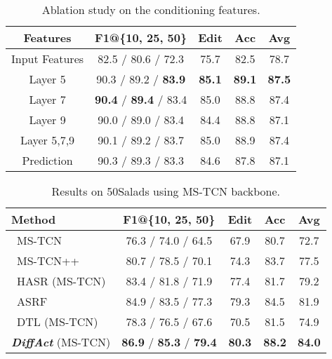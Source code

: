 \documentclass[10pt,twocolumn,letterpaper]{article}
\begin{document}
\begin{table}[t]
\begin{center}
\footnotesize
\begin{tabular}{c | c c c c c c}
\hline
 Features & \multicolumn{3}{c}{F1@\{10, 25, 50\}} & Edit & Acc & Avg\\
\hline
Input Features  & \multicolumn{3}{c}{ 82.5 / 80.6 / 72.3 } & 75.7 & 82.5 & 78.7 \\ 
 Layer 5 & \multicolumn{3}{c}{ 90.3 / 89.2 / \textbf{83.9} } & \textbf{85.1} & \textbf{89.1} & \textbf{87.5} \\ 
 Layer 7 & \multicolumn{3}{c}{ \textbf{90.4} / \textbf{89.4} / 83.4 } & 85.0 & 88.8 & 87.4 \\ 
 Layer 9 & \multicolumn{3}{c}{ 90.0 / 89.0 / 83.4 } & 84.4 & 88.8 & 87.1 \\ 
 Layer 5,7,9 & \multicolumn{3}{c}{ 90.1 / 89.2 / 83.7 } & 85.0 & 88.9 & 87.4 \\ 
 Prediction & \multicolumn{3}{c}{ 90.3 / 89.3 / 83.3 } & 84.6 & 87.8 & 87.1 \\ 
\hline
\end{tabular}
\end{center}
\caption{Ablation study on the conditioning features.} 
\label{table:ablation-feature}
\end{table}

\begin{table}[t]
\begin{center}
\footnotesize
\begin{tabular}{l | c c c c c c }
\hline
 Method & \multicolumn{3}{c}{F1@\{10, 25, 50\}} & Edit & Acc & Avg\\
\hline
~\cite{2019_CVPR_Farha}MS-TCN & \multicolumn{3}{c}{76.3 / 74.0 / 64.5} & 67.9 & 80.7 & 72.7\\
~\cite{2020_PAMI_Li}MS-TCN++ & \multicolumn{3}{c}{80.7 / 78.5 / 70.1} & 74.3 & 83.7 & 77.5\\
~\cite{2021_ICCV_Ahn}HASR (MS-TCN) & \multicolumn{3}{c}{83.4 / 81.8 / 71.9} & 77.4 & 81.7 & 79.2\\
~\cite{2021_WACV_Ishikawa}ASRF & \multicolumn{3}{c}{84.9 / 83.5 / 77.3} & 79.3 & 84.5 & 81.9\\
~\cite{2022_NeurIPS_Xu}DTL (MS-TCN) & \multicolumn{3}{c}{78.3 / 76.5 / 67.6} & 70.5 & 81.5 & 74.9\\
\hline
\textbf{\textit{DiffAct}} (MS-TCN) & \multicolumn{3}{c}{ \textbf{86.9} / \textbf{85.3} / \textbf{79.4} } & \textbf{80.3} & \textbf{88.2} & \textbf{84.0} \\
\hline
\end{tabular}
\end{center}
\caption{Results on 50Salads using MS-TCN backbone.} 
\label{table:mstcn}
\end{table}
\end{document}
